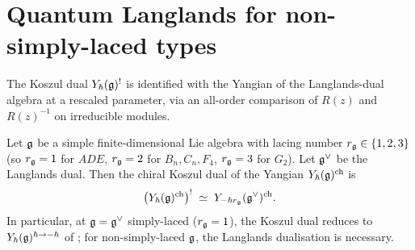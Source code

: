 \section{Quantum Langlands for non-simply-laced types}
\label{sec:langlands-nonsimplylaced}

The Koszul dual $Y_{\hbar}(\mathfrak{g})^{!}$ is identified with the Yangian
of the Langlands-dual algebra at a rescaled parameter, via an
all-order comparison of $R(z)$ and $R(z)^{-1}$ on irreducible modules.

\begin{theorem}
\label{thm:langlands-nonsimplylaced}
\ClaimStatusProvedHere
Let $\mathfrak{g}$ be a simple finite-dimensional Lie algebra with lacing
number $r_{\mathfrak{g}}\in\{1, 2, 3\}$ (so $r_{\mathfrak{g}} = 1$ for $ADE$,
$r_{\mathfrak{g}} = 2$ for $B_n, C_n, F_4$, $r_{\mathfrak{g}} = 3$ for $G_2$). Let
$\mathfrak{g}^{\vee}$ be the Langlands dual. Then the chiral Koszul dual of
the Yangian $Y_{\hbar}(\mathfrak{g})^{\mathrm{ch}}$ is
\[
 \bigl(Y_{\hbar}(\mathfrak{g})^{\mathrm{ch}}\bigr)^{!}
 \;\simeq\; Y_{-\hbar r_{\mathfrak{g}}}(\mathfrak{g}^{\vee})^{\mathrm{ch}}.
\]
In particular, at $\mathfrak{g} = \mathfrak{g}^{\vee}$ simply-laced ($r_{\mathfrak{g}} = 1$), the
Koszul dual reduces to
$Y_{\hbar}(\mathfrak{g})^{\hbar\to -\hbar}$ of \cite{Drinfeld85}; for non-simply-laced
$\mathfrak{g}$, the Langlands dualisation is necessary.
\end{theorem}

